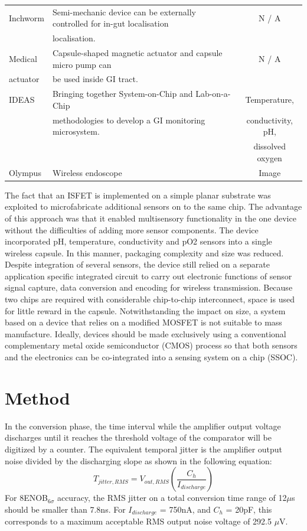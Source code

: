 \documentclass[twocolumn]{htl-author}
\begin{document}
\begin{center}
\begin{table}[!b]
{\begin{tabular}{|l|l|c|}
  Inchworm \cite{13} & Semi-mechanic device can be externally controlled for in-gut localisation & N / A \\
   & localisation.   & \\\hline
  Medical & Capsule-shaped magnetic actuator and capsule micro pump can  & N / A \\
   actuator \cite{14}   & be used inside GI tract.   & \\\hline
  IDEAS \cite{14} & Bringing together System-on-Chip and Lab-on-a-Chip  & Temperature,  \\
      & methodologies to develop a GI monitoring microsystem. & conductivity, pH,\\
     &  & dissolved oxygen  \\\hline
  Olympus \cite{14} & Wireless endoscope & Image \\
  \hline
\end{tabular}}
\end{table}
\end{center}
The fact that an ISFET is implemented on a simple planar substrate was exploited to microfabricate additional sensors on to the same chip.  The advantage of this approach was that it enabled multisensory functionality in the one device without the difficulties of adding more sensor components.  The device incorporated pH, temperature, conductivity and pO2 sensors into a single wireless capsule.  In this manner, packaging complexity and size was reduced. Despite integration of several sensors, the device still relied on a separate application specific integrated circuit to carry out electronic functions of sensor signal capture, data conversion and encoding for wireless transmission.  Because two chips are required with considerable chip-to-chip interconnect, space is used for little reward in the capsule. Notwithstanding the impact on size, a system based on a device that relies on a modified MOSFET is not suitable to mass manufacture.  Ideally, devices should be made exclusively using a conventional complementary metal oxide semiconductor (CMOS) process so that both sensors and the electronics can be co-integrated into a sensing system on a chip (SSOC).


\section{Method}
In the conversion phase, the time interval while the amplifier output voltage discharges until it reaches the threshold voltage of the comparator will be digitized by a counter. The equivalent temporal jitter is the amplifier output noise divided by the discharging slope as shown in the following equation:
\begin{equation}\label{equation4}
T_{jitter,RMS}=V_{out,RMS}\left( \dfrac{C_{h}}{I_{discharge}}\right)
\end{equation}
For 8ENOB$_{6\sigma}$ accuracy, the RMS jitter on a total conversion time range of 12$\mu$s
should be smaller than 7.8ns. For $I_{discharge}$ = 750nA, and $C_{h}$ = 20pF, this corresponds to a maximum acceptable RMS output noise voltage of 292.5 $\mu$V.
\end{document}
